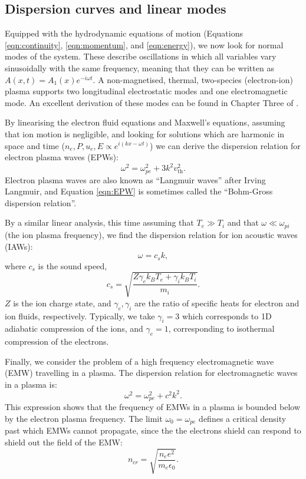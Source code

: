 \subsection{Dispersion curves and linear modes}\label{subsec:dispersion}

Equipped with the hydrodynamic equations of motion (Equations \ref{eqn:continuity}, \ref{eqn:momentum}, and \ref{eqn:energy}), we now look for normal modes of the system. These describe oscillations in which all variables vary sinusoidally with the same frequency, meaning that they can be written as $A(x,t) = A_1(x)e^{-i\omega t}$. A non-magnetised, thermal, two-species (electron-ion) plasma supports two longitudinal electrostatic modes and one electromagnetic mode. An excellent derivation of these modes can be found in Chapter Three of \citet{Jones1985}.

By linearising the electron fluid equations and Maxwell's equations, assuming that ion motion is negligible, and looking for solutions which are harmonic in space and time ($n_e,P,u_e,E \propto  e^{i(kx -\omega t)}$)  we can derive the dispersion relation for electron plasma waves (\acrshort{EPW}s):
\begin{equation}\label{eqn:EPW}
	\omega^{2}=\omega_{p e}^{2}+3 k^{2} v_{\text{th}}^{2}. 
\end{equation} Electron plasma waves are also known as ``Langmuir waves'' after Irving Langmuir, and Equation \ref{eqn:EPW} is sometimes called the ``Bohm-Gross dispersion relation''.

By a similar linear analysis, this time assuming that $T_e \gg T_i$ and that $\omega \ll \omega_{pi}$ (the ion plasma frequency), we find the dispersion relation for ion acoustic waves (\acrshort{IAW}s):
\begin{equation}\label{eqn:IAW}
 \omega =  c_{s} k,
\end{equation} where $c_{s}$ is the sound speed,
\begin{equation}
c_s = \sqrt{\frac{Z\gamma_ek_BT_e + \gamma_ik_BT_i}{m_i}}.
\end{equation} $Z$ is the ion charge state, and $\gamma_e,\gamma_i$ are the ratio of specific heats for electron and ion fluids, respectively. Typically, we take $\gamma_i = 3$ which corresponds to 1D adiabatic compression of the ions, and $\gamma_e = 1$, corresponding to isothermal compression of the electrons.

Finally, we consider the problem of a high frequency electromagnetic wave (\acrshort{EMW}) travelling in a plasma. The dispersion relation for electromagnetic waves in a plasma is:
\begin{equation}\label{eqn:EMW}
 \omega^{2}=\omega_{p e}^{2}+c^2k^{2}.
\end{equation} This expression shows that the frequency of EMWs in a plasma is bounded below by the electron plasma frequency. The limit $\omega_0=\omega_{pe}$ defines a critical density past which EMWs cannot propagate, since the the electrons shield can respond to shield out the field of the EMW:
\begin{equation}\label{eqn:ncrit}
 n_{cr} = \sqrt{\frac{n_e e^2}{m_e\epsilon_0}}.
\end{equation} 

